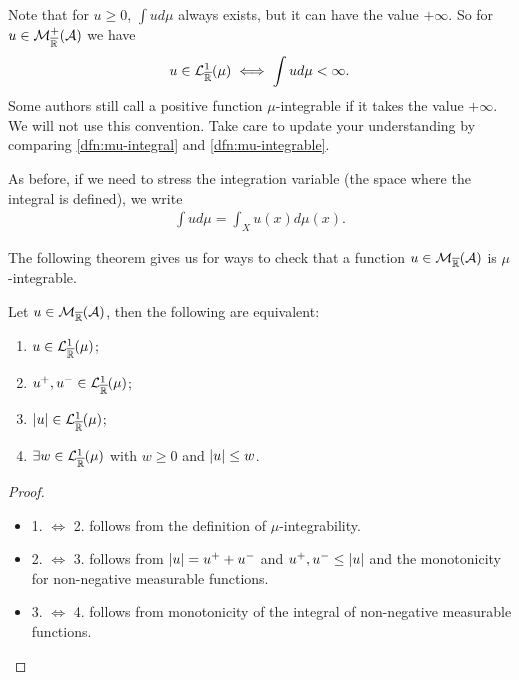 \begin{remark}
	Note that for $u \geq 0$, $\int u d\mu$ always exists, but it can have the value $+\infty$. So for $u \in \mathcal{M}_{\overline{\mathbb{R}}}^+(\mathcal{A})$ we have
	\begin{align*}
		u \in \mathcal{L}_{\overline{\mathbb{R}}}^1(\mu) \iff \int u d\mu < \infty.
	\end{align*}
	Some authors still call a positive function $\mu$-integrable if it takes the value $+\infty$. We will not use this convention. Take care to update your understanding by comparing \autoref{dfn:mu-integral} and \autoref{dfn:mu-integrable}.
\end{remark}

As before, if we need to stress the integration variable (the space where the integral is defined), we write
\begin{align*}
	\int u d\mu = \int_X u(x)d\mu(x).
\end{align*}

The following theorem gives us for ways to check that a function $u \in \mathcal{M}_{\overline{\mathbb{R}}}(\mathcal{A})$ is $\mu$-integrable.

\begin{thm}
	\label{thm:characterisation-mu-integral}
	Let $u \in \mathcal{M}_{\overline{\mathbb{R}}}(\mathcal{A})$, then the following are equivalent:
	
	\begin{enumerate}
		\item $u \in \mathcal{L}^1_{\overline{\mathbb{R}}}(\mu)$;
		\item $u^+, u^- \in \mathcal{L}_{\overline{\mathbb{R}}}^1(\mu)$;
		\item $\left\vert{u}\right\vert \in \mathcal{L}_{\overline{\mathbb{R}}}^1(\mu)$;
		\item $\exists w \in \mathcal{L}_{\overline{\mathbb{R}}}^1(\mu)$ with $w \geq 0$ and $\left\vert{u}\right\vert \leq w$.
	\end{enumerate}
\end{thm}

\begin{proof}$ $
	\begin{itemize}
		\item 1. $\iff$ 2. follows from the definition of $\mu$-integrability.
		\item 2. $\iff$ 3. follows from $\left\vert{u}\right\vert = u^+ + u^-$ and $u^+, u^- \leq \left\vert{u}\right\vert$ and the monotonicity for non-negative measurable functions.
		\item 3. $\iff$ 4. follows from monotonicity of the integral of non-negative measurable functions.
	\end{itemize}
\end{proof}

